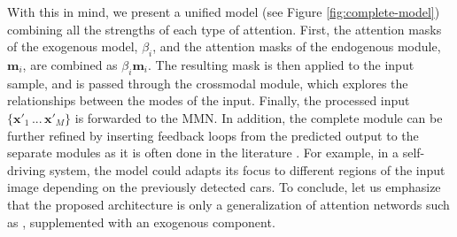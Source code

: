 With this in mind, we present a unified model (see Figure \ref{fig:complete-model}) combining all the strengths of each type of attention. First, the attention masks of the exogenous model, $\beta_i$, and the attention masks of the endogenous module, $\mathbf{m}_i$, are combined as $\beta_i\mathbf{m}_i$. The resulting mask is then applied to the input sample, and is passed through the crossmodal module, which explores the relationships between the modes of the input. Finally, the processed input $\{\mathbf{x}'_1\,...\,\mathbf{x}'_M\}$ is forwarded to the MMN. In addition, the complete module can be further refined by inserting feedback loops from the predicted output to the separate modules as it is often done in the literature \citep{afouras, attention-need, bahdanau}. For example, in a self-driving system, the model could adapts its focus to different regions of the input image depending on the previously detected cars. To conclude, let us emphasize that the proposed architecture is only a generalization of attention networds such as \citep{afouras}, supplemented with an exogenous component.


